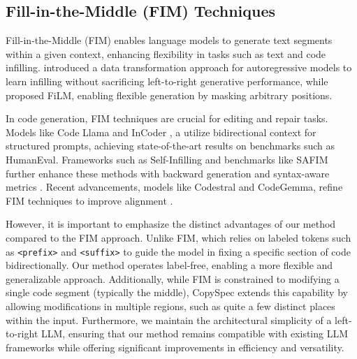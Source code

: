 \subsection{Fill-in-the-Middle (FIM) Techniques}

Fill-in-the-Middle (FIM) enables language models to generate text segments within a given context, enhancing flexibility in tasks such as text and code infilling. \citet{bavarian2022efficient} introduced a data transformation approach for autoregressive models to learn infilling without sacrificing left-to-right generative performance, while \citet{shen2023film} proposed FiLM, enabling flexible generation by masking arbitrary positions.

In code generation, FIM techniques are crucial for editing and repair tasks. Models like Code Llama \cite{roziere2023codellama} and InCoder \cite{fried2023incoder}, a utilize bidirectional context for structured prompts, achieving state-of-the-art results on benchmarks such as HumanEval. Frameworks such as Self-Infilling \cite{zheng2024selfinfillingcodegeneration} and benchmarks like SAFIM further enhance these methods with backward generation and syntax-aware metrics \cite{safim2023,gong2024evaluationllmssyntaxawarecode}. Recent advancements, models like Codestral and CodeGemma, refine FIM techniques to improve alignment \cite{ mistral2024codestral,codegemmateam2024codegemmaopencodemodels}.

However, it is important to emphasize the distinct advantages of our method compared to the FIM approach. Unlike FIM, which relies on labeled tokens such as \texttt{<prefix>} and \texttt{<suffix>} to guide the model in fixing a specific section of code bidirectionally. Our method operates label-free, enabling a more flexible and generalizable approach. Additionally, while FIM is constrained to modifying a single code segment (typically the middle), CopySpec extends this capability by allowing modifications in multiple regions, such as quite a few distinct places within the input. Furthermore, we maintain the architectural simplicity of a left-to-right LLM, ensuring that our method remains compatible with existing LLM frameworks while offering significant improvements in efficiency and versatility.